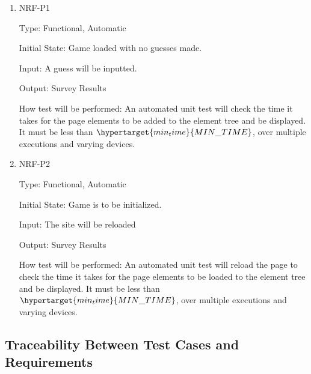 \documentclass[12pt, titlepage]{article}
\begin{document}
\begin{enumerate}

\item{NRF-P1\\}

Type: Functional, Automatic
					
Initial State: Game loaded with no guesses made. 
					
Input: A guess will be inputted.
					
Output: Survey Results
					
How test will be performed: An automated unit test will check the time it takes for the 
page elements to be added to the element tree and be displayed. It must be less than
$\hypertarget{min_time}{MIN\_TIME}$, over multiple executions and varying devices.

\item{NRF-P2\\}

Type: Functional, Automatic
					
Initial State: Game is to be initialized. 
					
Input: The site will be reloaded
					
Output: Survey Results
					
How test will be performed: An automated unit test will reload the page to check the time it takes for the 
page elements to be loaded to the element tree and be displayed. It must be less than
$\hypertarget{min_time}{MIN\_TIME}$, over multiple executions and varying devices.


\end{enumerate}


\subsection{Traceability Between Test Cases and Requirements}
\end{document}
